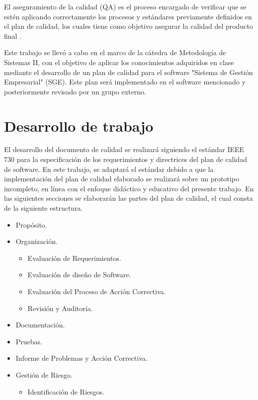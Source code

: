 \documentclass[a4paper,10pt]{article}
\begin{document}
	El aseguramiento de la calidad (QA) es el proceso encargado de verificar que se estén aplicando correctamente los procesos y estándares previamente definidos en el plan de calidad, los cuales tiene como objetivo asegurar la calidad del producto final \parencite{Sommerville_2011}.
	
	Este trabajo se llevó a cabo en el marco de la cátedra de Metodología de Sistemas II, con el objetivo de aplicar los conocimientos adquiridos en clase mediante el desarrollo de un plan de calidad para el software "Sistema de Gestión Empresarial" (SGE). Este plan será implementado en el software mencionado y posteriormente revisado por un grupo externo.
	
	\section{Desarrollo de trabajo}
	El desarrollo del documento de calidad se realizará siguiendo el estándar IEEE 730 \parencite{IEEE_Standards_Association} para la especificación de los requerimientos y directrices del plan de calidad de software. En este trabajo, se adaptará el estándar debido a que la implementación del plan de calidad elaborado se realizará sobre un prototipo incompleto, en línea con el enfoque didáctico y educativo del presente trabajo. En las siguientes secciones se elaborarán las partes del plan de calidad, el cual consta de la siguiente estructura.
	
	\begin{itemize}
		\item Propósito.
		\item Organización.
		\begin{itemize}
			\item Evaluación de Requerimientos.
			\item Evaluación de diseño de Software.
			\item Evaluación del Proceso de Acción Correctiva.
			\item Revisión y Auditoría.
		\end{itemize}
		\item Documentación.
		\item Pruebas.
		\item Informe de Problemas y Acción Correctiva.
		\item Gestión de Riesgo.
		\begin{itemize}
			\item Identificación de Riesgos.
		\end{itemize}
	\end{itemize}
	
\end{document}
